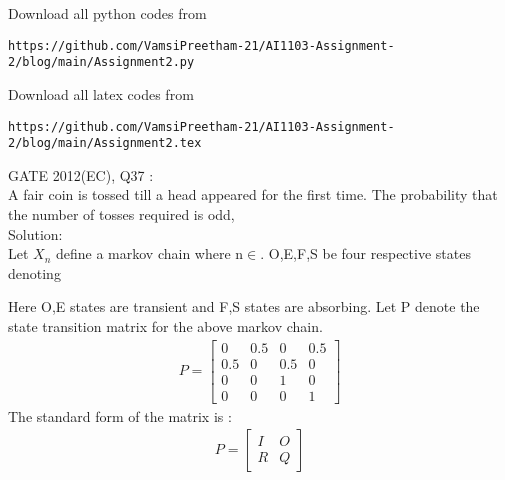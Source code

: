 \documentclass[journal,12pt,twocolumn]{IEEEtran}
\begin{document}
Download all python codes from
\begin{lstlisting}
https://github.com/VamsiPreetham-21/AI1103-Assignment-2/blog/main/Assignment2.py
\end{lstlisting}

Download all latex codes from
\begin{lstlisting}
https://github.com/VamsiPreetham-21/AI1103-Assignment-2/blog/main/Assignment2.tex
\end{lstlisting}

GATE 2012(EC), Q37 :\\
A fair coin is tossed till a head appeared for the first time. The probability that the number of tosses required is odd,\\

Solution:\\
Let $X_n$ define a markov chain where n$\in$. O,E,F,S be four respective states denoting 
\begin{center}
\begin{table}[h]
    \centering
    \caption{States of the notations used in the Markov Chain}
    \label{table 1}
\end{table}
\end{center}


Here O,E states are transient and F,S states are absorbing. 
Let P denote the state transition matrix for the above markov chain.
\begin{align}P =
\begin{bmatrix}
0 & 0.5 & 0 & 0.5 \\
0.5 & 0 & 0.5 & 0 \\
0 & 0 & 1 & 0 \\
0 & 0 & 0 & 1
\end{bmatrix}
\end{align}
The standard form of the matrix is :
\begin{align}P = 
\begin{bmatrix}
I & O \\
R & Q 
\end{bmatrix}
\end{align}
\end{document}
